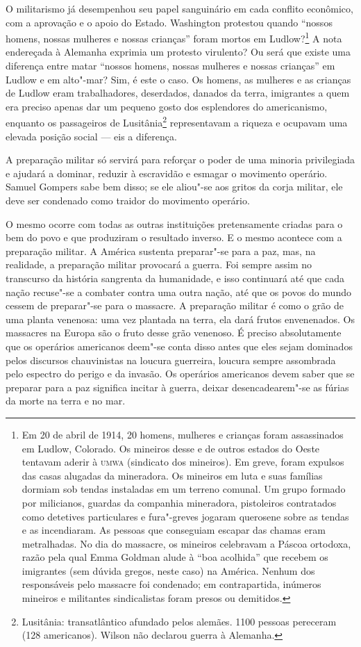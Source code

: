 O militarismo já desempenhou seu papel sanguinário em cada conflito
econômico, com a aprovação e o apoio do Estado. Washington protestou
quando “nossos homens, nossas mulheres e nossas crianças” foram mortos
em Ludlow?\footnote{
Em 20 de abril de 1914, 20 homens, mulheres e crianças foram
assassinados em Ludlow, Colorado. Os mineiros desse e de outros
estados do Oeste tentavam aderir à \textsc{umwa} (sindicato dos mineiros). 
Em greve, foram expulsos das casas alugadas da
mineradora. Os mineiros em luta e suas famílias dormiam sob
tendas instaladas em um terreno comunal. Um grupo formado por
milicianos, guardas da companhia mineradora, pistoleiros contratados
como detetives particulares e fura"-greves jogaram querosene sobre as
tendas e as incendiaram. As pessoas que conseguiam escapar
das chamas eram metralhadas. No dia do massacre,
os mineiros celebravam a Páscoa ortodoxa, razão pela qual Emma Goldman
alude à “boa acolhida” que recebem os imigrantes (sem dúvida gregos,
neste caso) na América. Nenhum dos responsáveis pelo massacre foi
condenado; em contrapartida, inúmeros mineiros e militantes
sindicalistas foram presos ou demitidos.}
A nota endereçada à Alemanha exprimia um protesto
virulento? Ou será que existe uma diferença entre matar “nossos homens,
nossas mulheres e nossas crianças” em Ludlow e em alto"-mar? Sim, é
este o caso.  Os homens, as mulheres e as crianças de Ludlow eram
trabalhadores, deserdados, danados da terra, imigrantes a quem era
preciso apenas dar um pequeno gosto dos esplendores do americanismo, enquanto
os passageiros de Lusitânia\footnote{
Lusitânia: transatlântico afundado pelos alemães. 1100 pessoas
pereceram (128 americanos). Wilson não declarou 
guerra à Alemanha.} representavam a riqueza e ocupavam uma 
elevada posição social --- eis a diferença.

A preparação militar só servirá para reforçar o poder de uma
minoria privilegiada e ajudará a dominar, reduzir à escravidão e
esmagar o movimento operário. Samuel Gompers sabe bem disso;
se ele aliou"-se aos gritos da corja militar, ele deve ser condenado 
como traidor do movimento operário.

O mesmo ocorre com todas as outras instituições pretensamente criadas
para o bem do povo e que produziram o resultado inverso. E o mesmo
acontece com a preparação militar. A América sustenta preparar"-se
para a paz, mas, na realidade, a preparação militar provocará a
guerra. Foi sempre assim no transcurso da história sangrenta da
humanidade, e isso continuará até que cada nação recuse"-se a combater
contra uma outra nação, até que os povos do mundo cessem de
preparar"-se para o massacre. A preparação militar é como o grão de
uma planta venenosa: uma vez plantada na terra, ela dará frutos
envenenados. Os massacres na Europa são o fruto desse grão venenoso. É
preciso absolutamente que os operários americanos deem"-se conta disso
antes que eles sejam dominados pelos discursos chauvinistas na loucura
guerreira, loucura sempre assombrada pelo espectro do perigo e da
invasão. Os operários americanos devem saber que se preparar para a paz
significa incitar à guerra, deixar desencadearem"-se as fúrias da morte
na terra e no mar.

